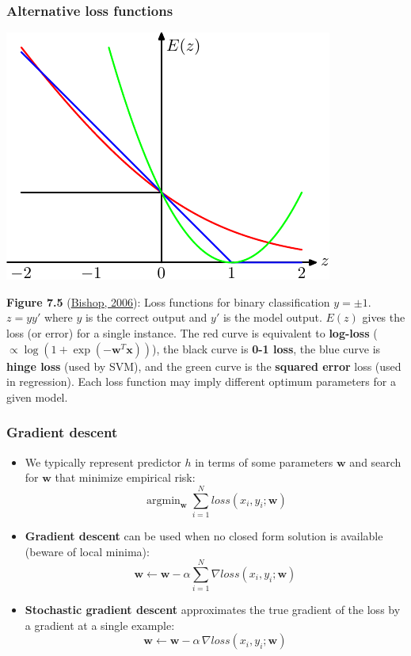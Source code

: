 \documentclass[ignorenonframetext,plain]{beamer}
\DeclareMathOperator*{\argmin}{argmin}
\newcommand{\loss}{\mathit{loss}}
\renewcommand{\vec}{\mathbf}
\begin{document}
\begin{frame}\frametitle{Alternative loss functions}
\begin{center}
\includegraphics[height=.5\textheight]{images/bishop-fig-7-5.pdf}
\end{center}\footnotesize
{\bf Figure 7.5}
(\href{http://research.microsoft.com/en-us/um/people/cmbishop/prml}
{Bishop, 2006}): Loss functions for binary classification $y=\pm 1$.
$z=yy'$ where $y$ is the correct output and $y'$ is the model output.
$E(z)$ gives the loss (or error) for a single instance.  The red curve
is equivalent to {\bf log-loss}
($\propto\log(1+\exp(-\vec{w}^T\vec{x}))$), the black curve is {\bf
  0-1 loss}, the blue curve is {\bf hinge loss} (used by SVM), and the
green curve is the {\bf squared error} loss (used in regression).
Each loss function may imply different optimum parameters for a given
model.
\end{frame}

\begin{frame}\frametitle{Gradient descent}
\begin{itemize}
\item We typically represent predictor $h$ in terms of some parameters
  $\vec{w}$ and search for $\vec{w}$ that minimize empirical
  risk: \[ 
  \argmin_\vec{w} \sum_{i=1}^N \loss(x_i, y_i; \vec{w})
  \]
\item {\bf Gradient descent} can be used when no closed form solution
  is available (beware of local minima): \[ \vec{w} \leftarrow
  \vec{w} - \alpha \sum_{i=1}^N \nabla \loss(x_i, y_i; \vec{w})
\]
\item {\bf Stochastic gradient descent} approximates the true gradient
  of the loss by a gradient at a single example: \[ \vec{w}
  \leftarrow \vec{w} - \alpha\, \nabla \loss(x_i, y_i; \vec{w})
\]
\end{itemize}
\end{frame}
\end{document}
